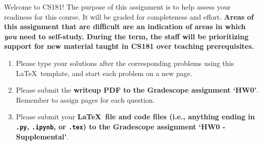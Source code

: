 \documentclass{harvardml}
\theoremstyle{definition}
\theoremstyle{plain}
\begin{document}
\noindent Welcome to CS181! The purpose of this assignment is to help assess your readiness for this course.  It will be graded for completeness and effort.  \textbf{Areas of this assignment that are difficult are an indication of areas in which \emph{you} need to self-study. During the term, the staff will be prioritizing support for new material taught in CS181 over teaching prerequisites.}

\begin{enumerate}
    \item Please type your solutions after the corresponding problems using this \LaTeX\ template, and start each problem on a new page.
    \item Please submit the \textbf{writeup PDF to the Gradescope assignment `HW0'}. Remember to assign pages for each question.
    \item Please submit your \textbf{\LaTeX\ file and code files (i.e., anything ending in \texttt{.py}, \texttt{.ipynb}, or \texttt{.tex}) to the Gradescope assignment `HW0 - Supplemental'}. 
\end{enumerate}
\end{document}

